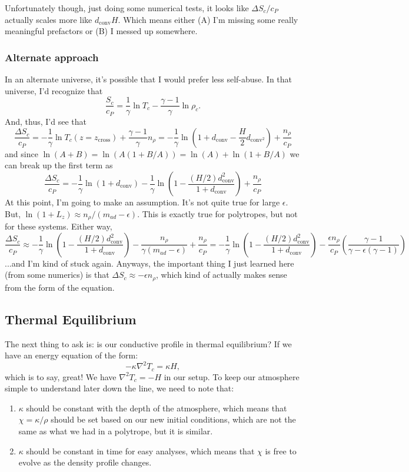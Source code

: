 \documentclass[aps, pre, onecolumn, nofootinbib, notitlepage, groupedaddress, amsfonts, amssymb, amsmath, longbibliography]{revtex4-1}
\newcommand{\grad}{\ensuremath{\nabla}}
\begin{document}
Unfortunately though, just doing some numerical tests, it looks like $\Delta S_c/c_P$ actually scales more like
$d_{\text{conv}}H$.  Which means either (A) I'm missing some really meaningful prefactors or (B) I messed up
somewhere.

\subsubsection{Alternate approach}
In an alternate universe, it's possible that I would prefer less self-abuse.  In that universe, I'd
recognize that
$$
\frac{S_c}{c_P} = \frac{1}{\gamma} \ln T_c - \frac{\gamma - 1}{\gamma} \ln \rho_c.
$$
And, thus, I'd see that
$$
\frac{\Delta S_c}{c_P} = -\frac{1}{\gamma}\ln T_c(z = z_{\text{cross}}) + \frac{\gamma - 1}{\gamma} n_{\rho}
= -\frac{1}{\gamma}\ln\left(1 + d_{\text{conv}} - \frac{H}{2}d_{\text{conv}^2}\right) + \frac{n_{\rho}}{c_P}
$$
and since $\ln(A + B) = \ln(A(1 + B/A)) = \ln(A) + \ln(1 + B/A)$ we can break up the first term as
$$
\frac{\Delta S_c}{c_P} = -\frac{1}{\gamma}\ln(1 + d_{\text{conv}}) - \frac{1}{\gamma}\ln\left(1 - \frac{(H/2)d_{\text{conv}}^2}{1 + d_{\text{conv}}}\right)
+ \frac{n_\rho}{c_P}
$$
At this point, I'm going to make an assumption.  It's not quite true for large $\epsilon$.  But,
$\ln(1 + L_z) \approx n_{\rho} / (m_{ad} - \epsilon)$.  This is exactly true for polytropes, but
not for these systems.  Either way,
$$
\frac{\Delta S_c}{c_P} \approx - \frac{1}{\gamma}\ln\left(1 - \frac{(H/2)d_{\text{conv}}^2}{1 + d_{\text{conv}}}\right)
-\frac{n_{\rho}}{\gamma(m_{ad}-\epsilon)} + \frac{n_{\rho}}{c_P} = 
- \frac{1}{\gamma}\ln\left(1 - \frac{(H/2)d_{\text{conv}}^2}{1 + d_{\text{conv}}}\right) - \frac{\epsilon n_\rho}{c_P}\left(\frac{\gamma - 1}{\gamma - \epsilon(\gamma - 1)}\right)
$$
...and I'm kind of stuck again.  Anyways, the important thing I just learned here (from some numerics) is that
$\Delta S_c \approx -\epsilon n_{\rho}$, which kind of actually makes sense from the form of the equation.

\subsection{Thermal Equilibrium}
The next thing to ask is: is our conductive profile in thermal equilibrium?  If we have an energy equation of the
form:
\begin{equation}
-\kappa \grad^2 T_c = \kappa H,
\end{equation}
which is to say, great!  We have $\grad^2 T_c = -H$ in our setup.  To keep our atmosphere simple
to understand later down the line, we need to note that:
\begin{enumerate}
\item $\kappa$ should be constant with the depth of the atmosphere, which means that
$\chi = \kappa/\rho$ should be set based on our new initial conditions, which are not
the same as what we had in a polytrope, but it is similar.
\item $\kappa$ should be constant in time for easy analyses, which means that $\chi$ is free
to evolve as the density profile changes.
\end{enumerate}
\end{document}
